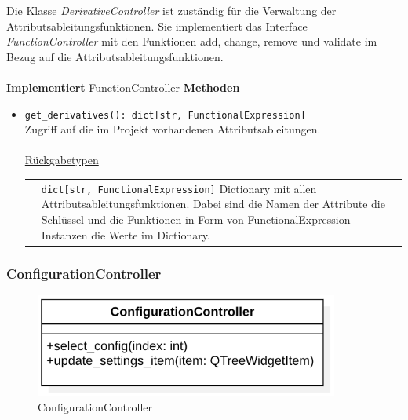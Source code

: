 \documentclass{article}
\begin{document}
Die Klasse \textit{DerivativeController} ist zuständig für die Verwaltung der Attributsableitungsfunktionen. Sie implementiert das Interface \textit{FunctionController} mit den Funktionen add, change, remove und validate im Bezug auf die Attributsableitungsfunktionen.\\\\
\textbf{\large{Implementiert}} FunctionController 
\textbf{\large{Methoden}}
\begin{itemize}
\item \texttt{get\_derivatives(): dict[str, FunctionalExpression]}\\ Zugriff auf die im Projekt vorhandenen Attributsableitungen.\\\\
\underline{{Rückgabetypen}}\\
\begin{tabular}{lp{10.7cm}}
 & \texttt{dict[str, FunctionalExpression]}  Dictionary mit allen Attributsableitungsfunktionen. Dabei sind die Namen der Attribute die Schlüssel und die Funktionen in Form von FunctionalExpression Instanzen die Werte im Dictionary.\\
\end{tabular}
\end{itemize}

\newpage
\subsubsection*{\large{\textbf{ConfigurationController}\label{cls:ConfigurationController}}}\normalsize

\begin{figure}[H]%
    \centering
    \includegraphics[width=10cm]{entwurf/Floriane/ConfigurationController.png}
    \caption{ConfigurationController}
\end{figure}
\end{document}
